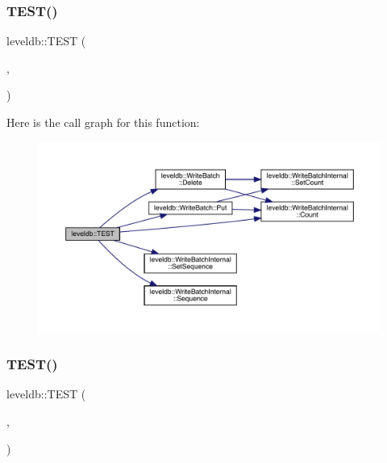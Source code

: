 \subsubsection{\texorpdfstring{TEST()}{TEST()}\hspace{0.1cm}{\footnotesize\ttfamily [9/102]}}
{\footnotesize\ttfamily leveldb\+::\+T\+E\+ST (\begin{DoxyParamCaption}\item[{\mbox{\hyperlink{classleveldb_1_1_write_batch_test}{Write\+Batch\+Test}}}]{,  }\item[{Multiple}]{ }\end{DoxyParamCaption})}

Here is the call graph for this function\+:
\nopagebreak
\begin{figure}[H]
\begin{center}
\leavevmode
\includegraphics[width=350pt]{namespaceleveldb_af2029a94a0a17d6eb1bfec4d38b7e3a0_cgraph}
\end{center}
\end{figure}
\mbox{\label{namespaceleveldb_a88307bc8d4ac8ed2a4d1a530b24e255f}} 
\subsubsection{\texorpdfstring{TEST()}{TEST()}\hspace{0.1cm}{\footnotesize\ttfamily [10/102]}}
{\footnotesize\ttfamily leveldb\+::\+T\+E\+ST (\begin{DoxyParamCaption}\item[{\mbox{\hyperlink{classleveldb_1_1_format_test}{Format\+Test}}}]{,  }\item[{Internal\+Key\+Short\+Separator}]{ }\end{DoxyParamCaption})}

